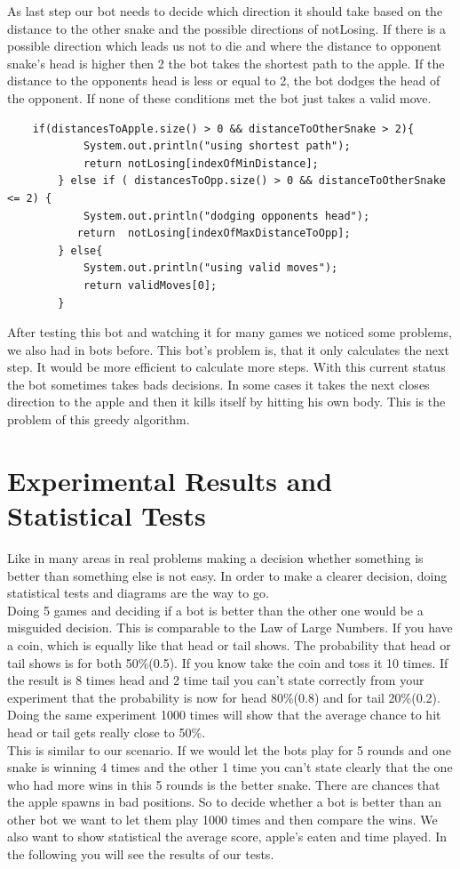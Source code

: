 \documentclass[a4paper,12pt]{article}
\begin{document}
As last step our bot needs to decide which direction it should take based on the distance to the other snake and the possible directions of notLosing. If there is a possible direction which leads us not to die and where the distance to opponent snake's head is higher then 2 the bot takes the shortest path to the apple. If the distance to the opponents head is less or equal to 2, the bot dodges the head of the opponent. If none of these conditions met the bot just takes a valid move.
\begin{verbatim}
	if(distancesToApple.size() > 0 && distanceToOtherSnake > 2){
            System.out.println("using shortest path");
            return notLosing[indexOfMinDistance];
        } else if ( distancesToOpp.size() > 0 && distanceToOtherSnake <= 2) {
            System.out.println("dodging opponents head");
           return  notLosing[indexOfMaxDistanceToOpp];
        } else{
            System.out.println("using valid moves");
            return validMoves[0];
        }
\end{verbatim}
After testing this bot and watching it for many games we noticed some problems, we also had in bots before. This bot's problem is, that it only calculates the next step. It would be more efficient to calculate more steps. With this current status the bot sometimes takes bads decisions. In some cases it takes the next closes direction to the apple and then it kills itself by hitting his own body. This is the problem of this greedy algorithm. 
\section{Experimental Results and Statistical Tests}
Like in many areas in real problems making a decision whether something is better than something else is not easy. In order to make a clearer decision, doing statistical tests and diagrams are the way to go.\\
Doing 5 games and deciding if a bot is better than the other one would be a misguided decision. This is comparable to the Law of Large Numbers. If you have a coin, which is equally like that head or tail shows. The probability that head or tail shows is for both 50\%(0.5). If you know take the coin and toss it 10 times. If the result is 8 times head and 2 time tail you can't state correctly from your experiment that the probability is now for head 80\%(0.8) and for tail 20\%(0.2). Doing the same experiment 1000 times will show that the average chance to hit head or tail gets really close to 50\%.\\
This is similar to our scenario. If we would let the bots play for 5 rounds and one snake is winning 4 times and the other 1 time you can't state clearly that the one who had more wins in this 5 rounds is the better snake. There are chances that the apple spawns in bad positions. So to decide whether a bot is better than an other bot we want to let them play 1000 times and then compare the wins. We also want to show statistical the average score, apple's eaten and time played. In the following you will see the results of our tests.\newpage
\end{document}
